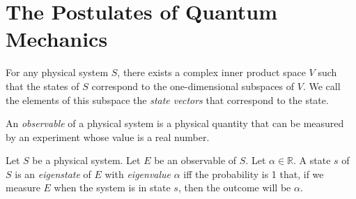 \chapter{The Postulates of Quantum Mechanics}

\begin{ax}
For any physical system $S$, there exists a complex inner product space $V$ such that the states of $S$ correspond to the one-dimensional subspaces of $V$. We call the elements of this subspace the \emph{state vectors} that correspond to the state.
\end{ax}

\begin{df}[Observable]
An \emph{observable} of a physical system is a physical quantity that can be measured by an experiment whose value is a real number.
\end{df}

\begin{df}[Eigenstate]
Let $S$ be a physical system. Let $E$ be an observable of $S$. Let $\alpha \in \mathbb{R}$. A state $s$ of $S$ is
an \emph{eigenstate} of $E$ with \emph{eigenvalue} $\alpha$ iff the probability is 1 that, if we measure $E$ when the system is in state $s$, then the outcome will be $\alpha$.
\end{df}

